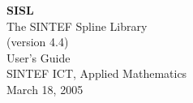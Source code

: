 \def \RR{\hbox{\rm I\negthinspace R}}

\pagestyle{headings}
\makeindex


\begin{titlepage}
  \vspace{5 cm}
  \begin{center}
  \Huge
  \textbf{SISL} \\
  \huge
  The SINTEF Spline Library \\ 
  \LARGE
  (version 4.4)\\ 
  User's Guide \\
  \vspace{10 mm}
  \large
  SINTEF ICT, Applied Mathematics \\
  March 18, 2005
  \end{center}

\end{titlepage}


\tableofcontents
\cleardoublepage
{}
\setcounter{page}{1}






\cleardoublepage

